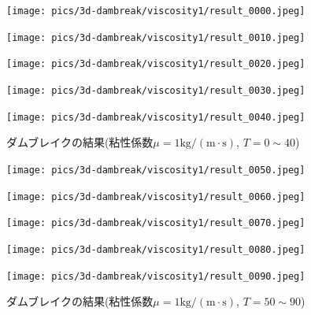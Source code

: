 \begin{figure}[H]
	\centering
	\begin{minipage}[b]{0.19\columnwidth}
	    \centering
	    \texttt{[image: pics/3d-dambreak/viscosity1/result\_0000.jpeg]}
	\end{minipage}
	\begin{minipage}[b]{0.19\columnwidth}
	    \centering
	    \texttt{[image: pics/3d-dambreak/viscosity1/result\_0010.jpeg]}
	\end{minipage}
	\begin{minipage}[b]{0.19\columnwidth}
	    \centering
	    \texttt{[image: pics/3d-dambreak/viscosity1/result\_0020.jpeg]}
	\end{minipage}
	\begin{minipage}[b]{0.19\columnwidth}
	    \centering
	    \texttt{[image: pics/3d-dambreak/viscosity1/result\_0030.jpeg]}
	\end{minipage}
	\begin{minipage}[b]{0.19\columnwidth}
	    \centering
	    \texttt{[image: pics/3d-dambreak/viscosity1/result\_0040.jpeg]}
	\end{minipage}
	\caption{ダムブレイクの結果(粘性係数$\mu = 1 \mathrm{kg/(m\cdot s)}$, $T=0 \sim 40$)}
	\label{fig:dambreak-result-visc1-1}
\end{figure}

\begin{figure}[H]
	\centering
	\begin{minipage}[b]{0.19\columnwidth}
	    \centering
	    \texttt{[image: pics/3d-dambreak/viscosity1/result\_0050.jpeg]}
	\end{minipage}
	\begin{minipage}[b]{0.19\columnwidth}
	    \centering
	    \texttt{[image: pics/3d-dambreak/viscosity1/result\_0060.jpeg]}
	\end{minipage}
	\begin{minipage}[b]{0.19\columnwidth}
	    \centering
	    \texttt{[image: pics/3d-dambreak/viscosity1/result\_0070.jpeg]}
	\end{minipage}
	\begin{minipage}[b]{0.19\columnwidth}
	    \centering
	    \texttt{[image: pics/3d-dambreak/viscosity1/result\_0080.jpeg]}
	\end{minipage}
	\begin{minipage}[b]{0.19\columnwidth}
	    \centering
	    \texttt{[image: pics/3d-dambreak/viscosity1/result\_0090.jpeg]}
	\end{minipage}
	\caption{ダムブレイクの結果(粘性係数$\mu = 1 \mathrm{kg/(m\cdot s)}$, $T=50 \sim 90$)}
	\label{fig:dambreak-result-visc1-2}
\end{figure}

